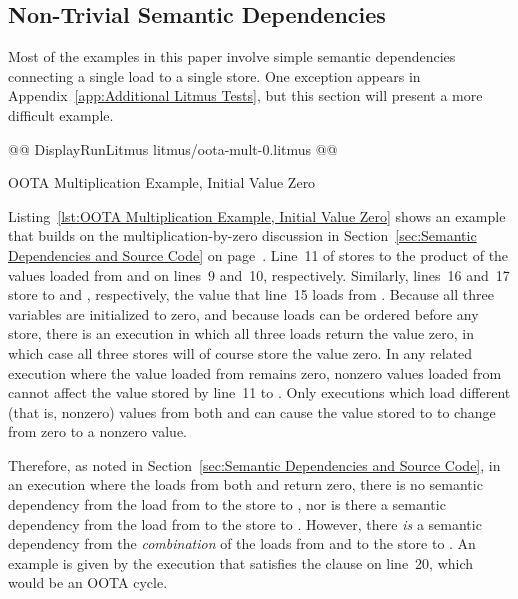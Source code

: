 \documentclass[10]{article}
\begin{document}
\subsection{Non-Trivial Semantic Dependencies}
\label{app:Non-Trivial Semantic Dependencies}

Most of the examples in this paper involve simple semantic dependencies
connecting a single load to a single store.
One exception appears in
Appendix~\ref{app:Additional Litmus Tests},
but this section will present a more difficult example.

\begin{listing}[tbp]
@@ DisplayRunLitmus litmus/oota-mult-0.litmus @@
\caption{OOTA Multiplication Example, Initial Value Zero}
\label{lst:OOTA Multiplication Example, Initial Value Zero}
\end{listing}

Listing~\ref{lst:OOTA Multiplication Example, Initial Value Zero}
shows an example that builds on the multiplication-by-zero
discussion in
Section~\ref{sec:Semantic Dependencies and Source Code}
on
page~\pageref{sec:Semantic Dependencies and Source Code}.
Line~11 of  stores to  the product of the values loaded from
 and  on lines~9 and~10, respectively.
Similarly, lines~16 and~17 store to  and , respectively,
the value that line~15 loads from .
Because all three variables are initialized to zero, and because loads
can be ordered before any store, there is an execution in which all
three loads return the value zero, in which case all three stores will
of course store the value zero.
In any related execution where the value loaded from  remains zero,
nonzero values loaded from  cannot affect the value stored by
line~11 to .
Only executions which load different (that is, nonzero) values from
both  and  can cause the value stored to  to change
from zero to a nonzero value.

Therefore, as noted in
Section~\ref{sec:Semantic Dependencies and Source Code},
in an execution where the loads from both  and  return zero,
there is no semantic dependency from the load from  to the
store to , nor is there a semantic dependency from the load
from  to the store to .
However, there \emph{is} a semantic dependency from the \emph{combination}
of the loads from  and  to the store to .
An example is given by the execution that satisfies the
 clause on line~20, which would be an OOTA cycle.
\end{document}

